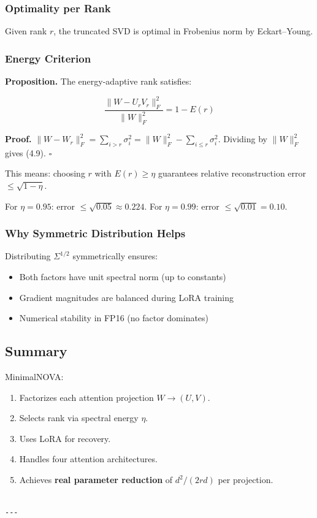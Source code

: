 \subsubsection{Optimality per Rank}

Given rank $r$, the truncated SVD is optimal in Frobenius norm by Eckart--Young.

\subsubsection{Energy Criterion}

\textbf{Proposition.} The energy-adaptive rank satisfies:

\[
\frac{\|W - U_r V_r\|_F^2}{\|W\|_F^2} = 1 - E(r)
\tag{4.9}
\]

\textbf{Proof.} $\|W - W_r\|_F^2 = \sum_{i > r} \sigma_i^2 = \|W\|_F^2 - \sum_{i \leq r} \sigma_i^2$. 
Dividing by $\|W\|_F^2$ gives (4.9). $\square$

This means: choosing $r$ with $E(r) \geq \eta$ guarantees relative 
reconstruction error $\leq \sqrt{1 - \eta}$.

For $\eta = 0.95$: error $\leq \sqrt{0.05} \approx 0.224$.
For $\eta = 0.99$: error $\leq \sqrt{0.01} = 0.10$.

\subsubsection{Why Symmetric Distribution Helps}

Distributing $\Sigma^{1/2}$ symmetrically ensures:
\begin{itemize}
\item Both factors have unit spectral norm (up to constants)
\item Gradient magnitudes are balanced during LoRA training
\item Numerical stability in FP16 (no factor dominates)

\end{itemize}
\subsection{Summary}

MinimalNOVA:
\begin{enumerate}
\item Factorizes each attention projection $W \to (U, V)$.
\item Selects rank via spectral energy $\eta$.
\item Uses LoRA for recovery.
\item Handles four attention architectures.
\item Achieves \textbf{real parameter reduction} of $d^2 / (2rd)$ per projection.
\end{enumerate}
\begin{lstlisting}

---
\end{lstlisting}


